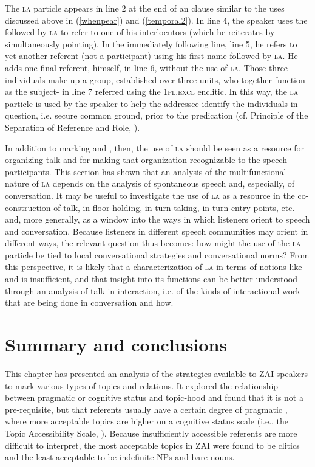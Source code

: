 The \textsc{la} particle appears in line 2 at the end of an  clause similar to the uses discussed above in (\ref{whenpear}) and (\ref{temporal2}). In line 4, the speaker uses the   followed by \textsc{la} to refer to one of his interlocutors (which he reiterates by simultaneously pointing). In the immediately following line, line 5, he refers to yet another  referent (not a participant) using his first name followed by \textsc{la}. He adds one final referent, himself, in line 6, without the use of \textsc{la}. Those three individuals make up a group, established over three  units, who together function as the subject- in line 7 referred using the 1\textsc{pl.excl} enclitic. In this way, the \textsc{la} particle is used by the speaker to help the addressee identify the individuals in question, i.e. secure common ground, prior to the predication (cf. Principle of the Separation of Reference and Role, \citealt{lambrecht1994}).

In addition to  marking and , then, the use of \textsc{la} should be seen as a resource for organizing talk and for making that organization recognizable to the speech participants. This section has shown that an analysis of the multifunctional nature of \textsc{la} depends on the analysis of spontaneous speech and, especially, of conversation. It may be useful to investigate the use of \textsc{la} as a resource in the co-construction of talk, in floor-holding, in turn-taking, in turn entry points, etc. and, more generally, as a window into the ways in which listeners orient to speech and conversation. Because listeners in different speech communities may orient in different ways, the relevant question thus becomes: how might the use of the \textsc{la} particle be tied to local conversational strategies and conversational norms? From this perspective, it is likely that a characterization of \textsc{la} in terms of notions like  and  is insufficient, and that insight into its functions can be better understood through an analysis of talk-in-interaction, i.e. of the kinds of interactional work that are being done in conversation and how.


\section{Summary and conclusions}

This chapter has presented an analysis of the strategies available to ZAI speakers to mark various types of topics and  relations. It explored the relationship between pragmatic or cognitive status and topic-hood and found that it is not a pre-requisite, but that  referents usually have a certain degree of pragmatic , where more acceptable topics are higher on a cognitive status scale (i.e., the Topic Accessibility Scale,  \citealt{lambrecht1994}). Because insufficiently accessible  referents are more difficult to interpret, the most acceptable topics in ZAI were found to be clitics and the least acceptable to be indefinite NPs and bare nouns.

